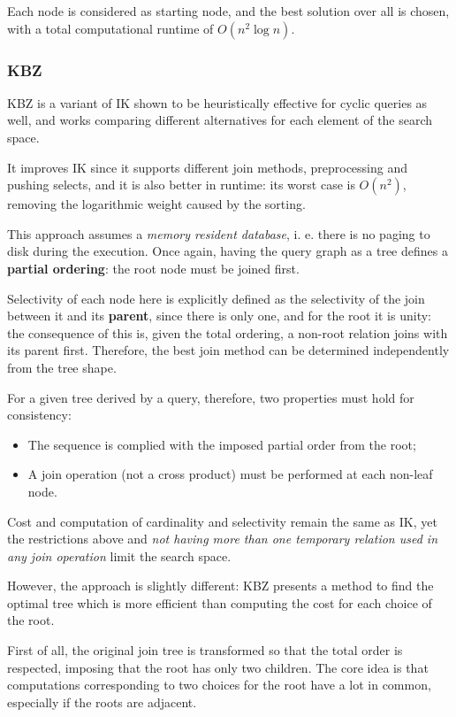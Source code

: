 Each node is considered as starting node, and the best solution over all is chosen, with a total computational runtime of $O(n^2\log n)$.

\subsubsection{KBZ}
KBZ is a variant of IK shown to be heuristically effective for cyclic queries as well, and works comparing different alternatives for each element of the search space. 

It improves IK since it supports different join methods, preprocessing and pushing selects, and it is also better in runtime: its worst case is $O(n^2)$, removing the logarithmic weight caused by the sorting.

This approach assumes a \textit{memory resident database}, i. e. there is no paging to disk during the execution. Once again, having the query graph as a tree defines a \textbf{partial ordering}: the root node must be joined first. 

Selectivity of each node here is explicitly defined as the selectivity of the join between it and its \textbf{parent}, since there is only one, and for the root it is unity: the consequence of this is, given the total ordering, a non-root relation joins with its parent first. Therefore, the best join method can be determined independently from the tree shape.

For a given tree derived by a query, therefore, two properties must hold for consistency:
\begin{itemize}
	\item The sequence is complied with the imposed partial order from the root;
	\item A join operation (not a cross product) must be performed at each non-leaf node.
\end{itemize}

Cost and computation of cardinality and selectivity remain the same as IK, yet the restrictions above and \textit{not having more than one temporary relation used in any join operation} limit the search space. 

However, the approach is slightly different: KBZ presents a method to find the optimal tree which is more efficient than computing the cost for each choice of the root. 

First of all, the original join tree is transformed so that the total order is respected, imposing that the root has only two children. The core idea is that computations corresponding to two choices for the root have a lot in common, especially if the roots are adjacent. 

